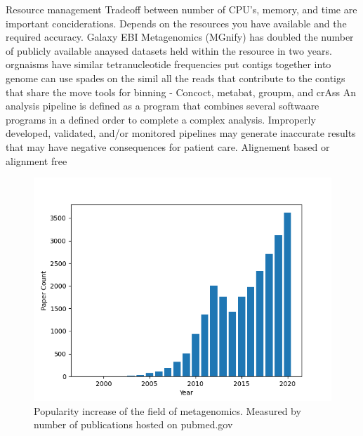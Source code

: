 \documentclass{article}
\begin{document}
Resource management
Tradeoff between number of CPU's, memory, and time are important conciderations.
Depends on the resources you have available and the required accuracy.
Galaxy
EBI Metagenomics (MGnify) has doubled the number of publicly available anaysed datasets held within the resource in two years.
orgnaisms have similar tetranucleotide frequencies put contigs together into genome
can use spades on the simil
all the reads that contribute to the contigs that share the move
tools for binning - Concoct, metabat, groupm, and crAss
An analysis pipeline is defined as a program that combines several softwaare programs in a defined order to complete a complex analysis.
Improperly developed, validated, and/or monitored pipelines may generate inaccurate results that may have negative consequences for patient care.
Alignement based or alignment free

\begin{figure}
\centering
\includegraphics[scale=0.7]{figures/popularity.png}
\caption[Popularity increase of the field of metagenomics]{
	Popularity increase of the field of metagenomics. Measured by number of publications hosted on pubmed.gov }
\label{Fpopularity}
\end{figure}
\end{document}
